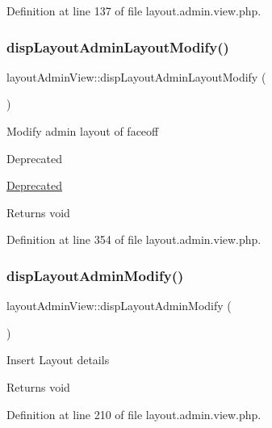 Definition at line 137 of file layout.\+admin.\+view.\+php.

\hypertarget{classlayoutAdminView_a1be4548859d4f3a913b33c4e8b395f51}{}\label{classlayoutAdminView_a1be4548859d4f3a913b33c4e8b395f51} 
\subsubsection{\texorpdfstring{disp\+Layout\+Admin\+Layout\+Modify()}{dispLayoutAdminLayoutModify()}}
{\footnotesize\ttfamily layout\+Admin\+View\+::disp\+Layout\+Admin\+Layout\+Modify (\begin{DoxyParamCaption}{ }\end{DoxyParamCaption})}

Modify admin layout of faceoff \begin{DoxyRefDesc}{Deprecated}
\item[\hyperlink{deprecated__deprecated000018}{Deprecated}]\end{DoxyRefDesc}
\begin{DoxyReturn}{Returns}
void 
\end{DoxyReturn}


Definition at line 354 of file layout.\+admin.\+view.\+php.

\hypertarget{classlayoutAdminView_a96a02667575c453953a50cc279443785}{}\label{classlayoutAdminView_a96a02667575c453953a50cc279443785} 
\subsubsection{\texorpdfstring{disp\+Layout\+Admin\+Modify()}{dispLayoutAdminModify()}}
{\footnotesize\ttfamily layout\+Admin\+View\+::disp\+Layout\+Admin\+Modify (\begin{DoxyParamCaption}{ }\end{DoxyParamCaption})}

Insert Layout details \begin{DoxyReturn}{Returns}
void 
\end{DoxyReturn}


Definition at line 210 of file layout.\+admin.\+view.\+php.

